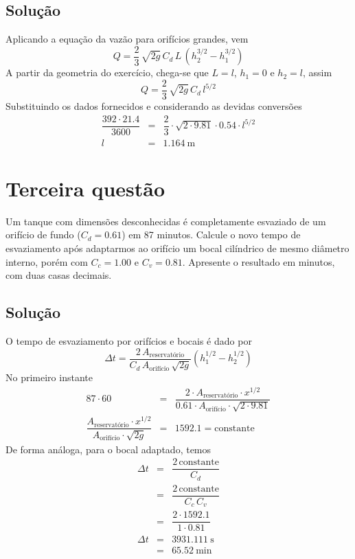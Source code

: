 \documentclass[a4paper, 12pt, brazilian]{article}
\numberwithin{equation}{section}
\begin{document}
	\subsection{Solução}
	Aplicando a equação da vazão para orifícios grandes, vem
	\begin{equation}
		Q=\dfrac{2}{3}\,\sqrt{2g}\,C_{d}\,L\,(h_{2}^{3/2}-h_{1}^{3/2})
	\end{equation}
	A partir da geometria do exercício, chega-se que $L=l$, $h_{1}=0$ e $h_{2}=l$, assim
	\begin{equation}
		Q=\dfrac{2}{3}\,\sqrt{2g}\,C_{d}\,l^{5/2}
	\end{equation}
	Substituindo os dados fornecidos e considerando as devidas conversões
	\begin{eqnarray}
		\dfrac{392\cdot 21.4}{3600}&=&\dfrac{2}{3}\cdot\sqrt{2\cdot 9.81}\cdot 0.54\cdot l^{5/2}\\
		l&=&\SI{1.164}{\meter}
	\end{eqnarray}
	\section{Terceira questão}
	Um tanque com dimensões desconhecidas é completamente esvaziado de um orifício de fundo ($C_{d}=0.61$) em 87 minutos. Calcule o novo tempo de esvaziamento após adaptarmos ao orifício um bocal cilíndrico de mesmo diâmetro interno, porém com $C_{c}=1.00$ e $C_{v}=0.81$. Apresente o resultado em minutos, com duas casas decimais.
	\subsection{Solução}
	O tempo de esvaziamento por orifícios e bocais é dado por
	\begin{equation}
		\Delta t=\dfrac{2\,A_{\textrm{reservatório}}}{C_{d}\,A_{\textrm{orifício}}\,\sqrt{2g}}(h_{1}^{1/2}-h_{2}^{1/2})
	\end{equation}
	No primeiro instante
	\begin{eqnarray}
		87\cdot 60&=&\dfrac{2\cdot A_{\textrm{reservatório}}\cdot x^{1/2}}{0.61\cdot A_{\textrm{orifício}}\cdot\sqrt{2\cdot 9.81}}\\
		\dfrac{A_{\textrm{reservatório}}\cdot x^{1/2}}{A_{\textrm{orifício}}\cdot\sqrt{2g}}&=&1592.1=\textrm{constante}
	\end{eqnarray}
	De forma análoga, para o bocal adaptado, temos
	\begin{eqnarray}
		\Delta t&=&\dfrac{2\,\textrm{constante}}{C_{d}}\\
		&=&\dfrac{2\,\textrm{constante}}{C_{c}\,C_{v}}\\
		&=&\dfrac{2\cdot 1592.1}{1\cdot 0.81}\\
		\Delta t&=&\SI{3931.111}{\second}\\
		&=&\SI{65.52}{\minute}
	\end{eqnarray}
\end{document}
